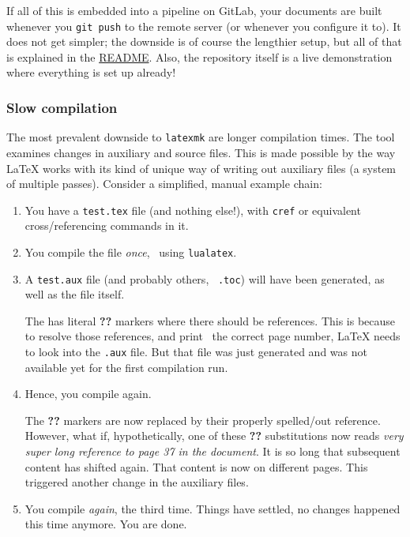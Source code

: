 If all of this is embedded into a pipeline on GitLab, your documents are built whenever
you \texttt{git push} to the remote server (or whenever you configure it to).
It does not get simpler; the downside is of course the lengthier setup, but all of that
is explained in the
\href{https://collaborating.tuhh.de/alex/latex-git-cookbook/-/blob/master/README.md}{README}.
Also, the repository itself is a live demonstration where everything is set up already!

\subsubsection{Slow compilation}

The most prevalent downside to \texttt{latexmk} are longer compilation times.
The tool examines changes in auxiliary and source files.
This is made possible by the way \LaTeX{} works with its kind of unique way of writing out auxiliary files (a system of multiple passes).
Consider a simplified, manual example chain:
\begin{enumerate}
    \item You have a \texttt{test.tex} file (and nothing else!), with \texttt{cref} or equivalent cross\-/referencing commands in it.
    \item You compile the file \emph{once}, \ using \texttt{lualatex}.
    \item A \texttt{test.aux} file (and probably others, \ \texttt{.toc}) will have been generated, as well as the  file itself.

        The  has literal \textbf{??} markers where there should be references.
        This is because to resolve those references, and print \ the correct page number, \LaTeX{} needs to look into the \texttt{.aux} file.
        But that file was just generated and was not available yet for the first compilation run.
    \item Hence, you compile again.

        The \textbf{??} markers are now replaced by their properly spelled\-/out reference.
        However, what if, hypothetically, one of these \textbf{??} substitutions now reads \emph{very super long reference to page 37 in the document}.
        It is so long that subsequent content has shifted again.
        That content is now on different pages.
        This triggered another change in the auxiliary files.
    \item \label{item:last_compilation} You compile \emph{again}, the third time.
        Things have settled, no changes happened this time anymore.
        You are done.
\end{enumerate}

